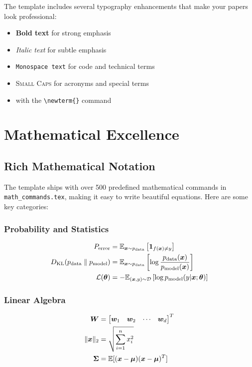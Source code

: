 \documentclass{triton}
\begin{document}
The template includes several typography enhancements that make your papers look professional:

\begin{itemize}
    \item \textbf{Bold text} for strong emphasis
    \item \textit{Italic text} for subtle emphasis  
    \item \texttt{Monospace text} for code and technical terms
    \item \textsc{Small Caps} for acronyms and special terms
    \item {} with the \verb|\newterm{}| command
\end{itemize}

\section{Mathematical Excellence}

\subsection{Rich Mathematical Notation}

The template ships with over 500 predefined mathematical commands in \texttt{math\_commands.tex}, making it easy to write beautiful equations. Here are some key categories:

\subsubsection{Probability and Statistics}
\begin{align}
P_{\text{error}} &= \mathbb{E}_{{\bm{x}} \sim p_{\rm{data}}}\left[\bm{1}_{f({\bm{x}}) \neq y}\right] \\
D_{\mathrm{KL}}(p_{\rm{data}} \parallel p_{\rm{model}}) &= \mathbb{E}_{{\bm{x}} \sim p_{\rm{data}}}\left[\log \frac{p_{\rm{data}}({\bm{x}})}{p_{\rm{model}}({\bm{x}})}\right] \\
\mathcal{L}({\bm{\theta}}) &= -\mathbb{E}_{({\bm{x}},y) \sim \mathcal{D}}\left[\log p_{\rm{model}}(y|{\bm{x}}; {\bm{\theta}})\right]
\end{align}

\subsubsection{Linear Algebra}
\begin{align}
{\bm{W}} &= \begin{bmatrix} {\bm{w}}_1 & {\bm{w}}_2 & \cdots & {\bm{w}}_d \end{bmatrix}^T \\
\|{\bm{x}}\|_2 &= \sqrt{\sum_{i=1}^n x_i^2} \\
{\bm{\Sigma}} &= \mathbb{E}[({\bm{x}} - {\bm{\mu}})({\bm{x}} - {\bm{\mu}})^T]
\end{align}
\end{document}
